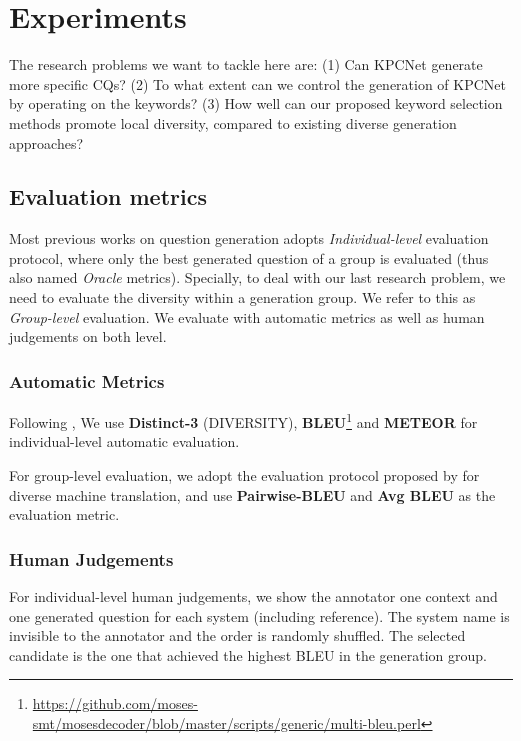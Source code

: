 \section{Experiments}
\label{sec:experiments}
The research problems we want to tackle here are: 
(1) Can KPCNet generate more specific CQs? 
(2) To what extent can we control the generation of KPCNet by operating on the keywords? 
(3) How well can our proposed keyword selection methods promote local diversity, compared to existing diverse generation approaches?

\subsection{Evaluation metrics}
Most previous works on question generation \citep{jain2017creativity, hu2018aspect, rao2019answer} adopts \textit{Individual-level} evaluation protocol, where only the best generated question of a group is evaluated (thus also named \textit{Oracle} metrics). Specially, to deal with our last research problem, we need to evaluate the diversity within a generation group. We refer to this as \textit{Group-level} evaluation. We evaluate with automatic metrics as well as human judgements on both level. 

\subsubsection{Automatic Metrics}
Following \citep{rao2019answer}, We use \textbf{Distinct-3} (DIVERSITY), \textbf{BLEU}\footnote{\url{https://github.com/moses-smt/mosesdecoder/blob/master/scripts/generic/multi-bleu.perl}}\citep{papineni2002bleu} and 
\textbf{METEOR} \citep{banerjee2005meteor} for individual-level automatic evaluation.

For group-level evaluation, we adopt the evaluation protocol proposed by \citet{shen2019mixture} for diverse machine translation, and use \textbf{Pairwise-BLEU} and \textbf{Avg BLEU} as the evaluation metric.

\subsubsection{Human Judgements}
For individual-level human judgements, we show the annotator one context and one generated question for each system (including reference). The system name is invisible to the annotator and the order is randomly shuffled. The selected candidate is the one that achieved the highest BLEU in the generation group. 

